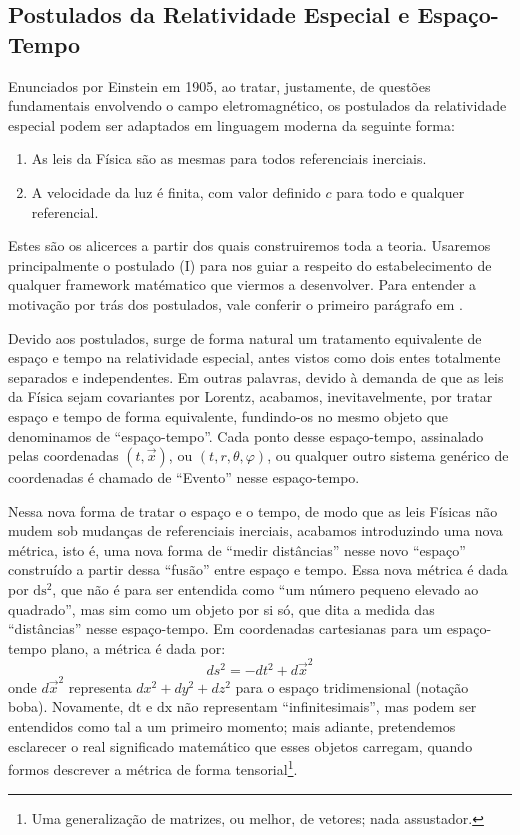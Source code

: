 \documentclass[12pt,a4paper]{article}
\begin{document}
\subsection{Postulados da Relatividade Especial e Espaço-Tempo}
Enunciados por Einstein em 1905, ao tratar, justamente,
de questões fundamentais envolvendo o campo eletromagnético\cite{einstein1905}, os postulados da relatividade
especial podem ser adaptados em linguagem moderna da seguinte forma:
\begin{enumerate}[label=\Roman*.]
  \item As leis da Física são as mesmas para todos referenciais inerciais.
  \item A velocidade da luz é finita, com valor definido $c$ para todo e qualquer referencial.
\end{enumerate}

Estes são os alicerces a partir dos quais construiremos toda a teoria. Usaremos principalmente o postulado (I)
para nos guiar a respeito do estabelecimento de qualquer framework matématico que viermos a desenvolver. Para
entender a motivação por trás dos postulados, vale conferir o primeiro parágrafo em \cite{einstein1905}.

Devido aos postulados, surge de forma natural um tratamento equivalente de espaço e tempo na relatividade
especial, antes vistos como dois entes totalmente separados e independentes. Em outras palavras, devido à demanda
de que as leis da Física sejam covariantes por Lorentz, acabamos, inevitavelmente, por tratar espaço e tempo de
forma equivalente, fundindo-os no mesmo objeto que denominamos de \enquote{espaço-tempo}. Cada ponto desse
espaço-tempo, assinalado pelas coordenadas $(t,\vec{x})$, ou $(t,r,\theta,\varphi)$, ou qualquer outro sistema genérico de
coordenadas é chamado de \enquote{Evento} nesse espaço-tempo.

Nessa nova forma de tratar o espaço e o tempo, de modo que as leis Físicas não mudem sob mudanças de referenciais
inerciais, acabamos introduzindo uma nova métrica, isto é, uma nova forma de \enquote{medir distâncias} nesse novo
\enquote{espaço} construído a partir dessa \enquote{fusão} entre espaço e tempo. Essa nova métrica é dada
por $\mathrm{ds^2}$, que não é para ser entendida como \enquote{um número pequeno elevado ao quadrado}, mas sim 
como um objeto por si só, que dita a medida das \enquote{distâncias} nesse espaço-tempo.
Em coordenadas cartesianas para um espaço-tempo plano, a métrica é dada por:
\begin{equation*}
  ds^2 = -dt^2 + d\vec{x}^2
\end{equation*}
onde $d\vec{x}^2$ representa $dx^2 + dy^2 + dz^2$ para o espaço tridimensional (notação boba). Novamente,
$\mathrm{dt}$ e $\mathrm{dx}$ não representam \enquote{infinitesimais}, mas podem ser entendidos como tal a um primeiro momento;
mais adiante, pretendemos esclarecer o real significado matemático que esses objetos carregam, quando formos
descrever a métrica de forma tensorial\footnote{Uma generalização de matrizes, ou melhor, de vetores; nada assustador.}.
\end{document}
